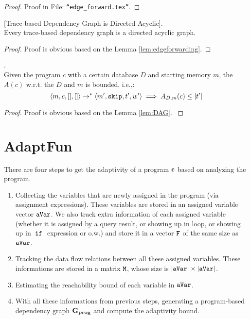 \documentclass[a4paper,11pt]{article}
\newcommand{\THESYSTEM}{\textsf{AdaptFun}}
\begin{document}
%
\begin{proof}
Proof in File: {\tt ``edge\_forward.tex''}.
% 
\end{proof}
%
%
%
\begin{lem}
\label{lem:DAG}
[Trace-based Dependency Graph is Directed Acyclic].
\\
%
{
Every trace-based dependency graph is a directed acyclic graph.
}
\end{lem}
%
{
\begin{proof}
Proof is obvious based on the Lemma \ref{lem:edgeforwarding}.
\end{proof}
}
%
\begin{lem}
.
\\
{
Given the program $c$ with a certain database $D$ and starting memory $m$, the $A(c)$ w.r.t. the $D$ and $m$ is bounded, i.e.,:
%
\[
\langle m, c, [], [] \rangle 
\rightarrow^{*} 
\langle m', \mathtt{skip}, t', w' \rangle 
\implies
A_{D, m}(c) \leq |t'|
\]
}
\end{lem}
%
\begin{proof}
{
Proof is obvious based on the Lemma \ref{lem:DAG}.
}
\end{proof}
%
%
\clearpage
%
%

%
%
\section{\THESYSTEM}
There are four steps to get the adaptivity of a program ${\boldsymbol{\mathbf{c}}}$ based on analyzing the program. 
\begin{enumerate}
    \item Collecting the variables that are newly assigned in the program (via assignment expressions). These variables are stored in an assigned variable vector $\mathtt{aVar}$. 
    We also track extra information of each assigned variable (whether it is assigned by a query result, or showing up in loop, or showing up in $\;\mathtt{if}\;$ expression or o.w.) and store it in a vector $\mathtt{F}$ of the same size as $\mathtt{aVar}$.
    \item Tracking the data flow relations between all these assigned variables. These informations are stored in a matrix $\mathtt{M}$, whose size is $|\mathtt{aVar}| \times |\mathtt{aVar}|$. 
    \item Estimating the reachability bound of each variable in $\mathtt{aVar}$.
    \item With all these informations from previous steps, generating a program-based dependency graph $\mathtt{\bf{G_{prog}}}$ and compute the adaptivity bound.
\end{enumerate}
\end{document}
